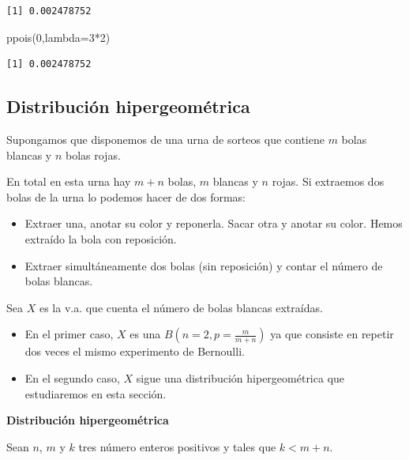 \documentclass[
  letterpaper,
  DIV=11,
  numbers=noendperiod]{scrreprt}
\newenvironment{Shaded}{\begin{snugshade}}{\end{snugshade}}
\newcommand{\AttributeTok}[1]{\textcolor[rgb]{0.40,0.45,0.13}{#1}}
\newcommand{\DecValTok}[1]{\textcolor[rgb]{0.68,0.00,0.00}{#1}}
\newcommand{\FunctionTok}[1]{\textcolor[rgb]{0.28,0.35,0.67}{#1}}
\newcommand{\NormalTok}[1]{\textcolor[rgb]{0.00,0.23,0.31}{#1}}
\newcommand{\SpecialCharTok}[1]{\textcolor[rgb]{0.37,0.37,0.37}{#1}}
\providecommand{\tightlist}{%
  \setlength{\itemsep}{0pt}\setlength{\parskip}{0pt}}\usepackage{longtable,booktabs,array}
\begin{document}
\begin{verbatim}
[1] 0.002478752
\end{verbatim}

\begin{Shaded}
\begin{Highlighting}[]
\FunctionTok{ppois}\NormalTok{(}\DecValTok{0}\NormalTok{,}\AttributeTok{lambda=}\DecValTok{3}\SpecialCharTok{*}\DecValTok{2}\NormalTok{)}
\end{Highlighting}
\end{Shaded}

\begin{verbatim}
[1] 0.002478752
\end{verbatim}

\hypertarget{distribuciuxf3n-hipergeomuxe9trica}{%
\subsection{Distribución
hipergeométrica}\label{distribuciuxf3n-hipergeomuxe9trica}}

Supongamos que disponemos de una urna de sorteos que contiene \(m\)
bolas blancas y \(n\) bolas rojas.

En total en esta urna hay \(m+n\) bolas, \(m\) blancas y \(n\) rojas. Si
extraemos dos bolas de la urna lo podemos hacer de dos formas:

\begin{itemize}
\tightlist
\item
  Extraer una, anotar su color y reponerla. Sacar otra y anotar su
  color. Hemos extraído la bola con reposición.
\item
  Extraer simultáneamente dos bolas (sin reposición) y contar el número
  de bolas blancas.
\end{itemize}

Sea \(X\) es la v.a. que cuenta el número de bolas blancas extraídas.

\begin{itemize}
\tightlist
\item
  En el primer caso, \(X\) es una \(B(n=2,p=\frac{m}{m+n})\) ya que
  consiste en repetir dos veces el mismo experimento de Bernoulli.
\item
  En el segundo caso, \(X\) sigue una distribución hipergeométrica que
  estudiaremos en esta sección.
\end{itemize}

\textbf{Distribución hipergeométrica}

Sean \(n\), \(m\) y \(k\) tres número enteros positivos y tales que
\(k<m+n\).
\end{document}
